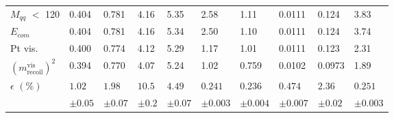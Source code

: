 \begin{table}
\begin{tabular}{|p{}|p{}p{}p{}|p{}|p{}p{}p{}p{}|p{}|}
$M_{qq}$ $<$ 120 & {0.404 } &  {0.781 } &  {4.16} & {5.35} &  {2.58} &  {1.11} &  {0.0111} &  {0.124} & 3.83\\ 
 
$E_{com}$ & {0.404 } &  {0.781 } &  {4.16} & {5.34} &  {2.50} &  {1.10} &  {0.0111} &  {0.124} &3.74\\ 

Pt vis. & {0.400 } &  {0.774 } &  {4.12} & {5.29} &  {1.17} &  {1.01} &  {0.0111} &  {0.123} &2.31\\ 
 
$(m^{\text{vis}}_{\text{recoil}})^2$ & {0.394 } &  {0.770 } &  {4.07} & {5.24} &  {1.02} &  {0.759} &  {0.0102} &  {0.0973}& 1.89 \\ 
\hline 
 $\epsilon \, \, (\%)$ & $1.02 $ & $1.98 $ & $10.5 $ &  $4.49 $ & $0.241 $ & $0.236 $ & $0.474 $ & $2.36 $ & $0.251$\\ 

  	     & $\pm 0.05$ & $\pm 0.07$ & $\pm 0.2$ & $\pm 0.07$ & $\pm 0.003$ & $\pm 0.004$ & $\pm 0.007$ & $\pm 0.02$ & $\pm 0.003$ \\

 \hline
 \end{tabular}
 

\end{table}


